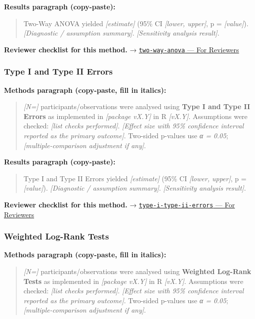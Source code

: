 \documentclass[
]{article}
\begin{document}
\textbf{Results paragraph (copy-paste):}

\begin{quote}
Two-Way ANOVA yielded \emph{{[}estimate{]}} (95\% CI \emph{{[}lower,
upper{]}}, p = \emph{{[}value{]}}). \emph{{[}Diagnostic / assumption
summary{]}}. \emph{{[}Sensitivity analysis result{]}}.
\end{quote}

\textbf{Reviewer checklist for this method.} →
\href{../chapters/04-inferential/two-way-anova.Rmd\#for-reviewers}{\texttt{two-way-anova}
--- For Reviewers}

\subsubsection{Type I and Type II
Errors}\label{type-i-and-type-ii-errors}

\textbf{Methods paragraph (copy-paste, fill in italics):}

\begin{quote}
\emph{{[}N={]}} participants/observations were analysed using
\textbf{Type I and Type II Errors} as implemented in \emph{{[}package
vX.Y{]}} in R \emph{{[}vX.Y{]}}. Assumptions were checked: \emph{{[}list
checks performed{]}}. \emph{{[}Effect size with 95\% confidence interval
reported as the primary outcome{]}}. Two-sided p-values use \emph{α =
0.05}; \emph{{[}multiple-comparison adjustment if any{]}}.
\end{quote}

\textbf{Results paragraph (copy-paste):}

\begin{quote}
Type I and Type II Errors yielded \emph{{[}estimate{]}} (95\% CI
\emph{{[}lower, upper{]}}, p = \emph{{[}value{]}}). \emph{{[}Diagnostic
/ assumption summary{]}}. \emph{{[}Sensitivity analysis result{]}}.
\end{quote}

\textbf{Reviewer checklist for this method.} →
\href{../chapters/04-inferential/type-i-type-ii-errors.Rmd\#for-reviewers}{\texttt{type-i-type-ii-errors}
--- For Reviewers}

\subsubsection{Weighted Log-Rank Tests}\label{weighted-log-rank-tests}

\textbf{Methods paragraph (copy-paste, fill in italics):}

\begin{quote}
\emph{{[}N={]}} participants/observations were analysed using
\textbf{Weighted Log-Rank Tests} as implemented in \emph{{[}package
vX.Y{]}} in R \emph{{[}vX.Y{]}}. Assumptions were checked: \emph{{[}list
checks performed{]}}. \emph{{[}Effect size with 95\% confidence interval
reported as the primary outcome{]}}. Two-sided p-values use \emph{α =
0.05}; \emph{{[}multiple-comparison adjustment if any{]}}.
\end{quote}
\end{document}
